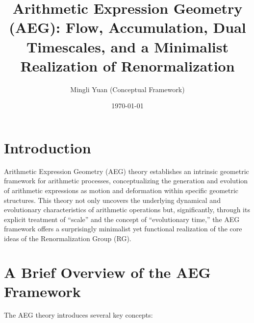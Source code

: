 \documentclass{article}
\title{Arithmetic Expression Geometry (AEG): Flow, Accumulation, Dual Timescales, and a Minimalist Realization of Renormalization}
\author{Mingli Yuan (Conceptual Framework)}
\date{\today}
\begin{document}
\maketitle

\section{Introduction}
Arithmetic Expression Geometry (AEG) theory \cite{YuanAEG} establishes an intrinsic geometric framework for arithmetic processes, conceptualizing the generation and evolution of arithmetic expressions as motion and deformation within specific geometric structures. This theory not only uncovers the underlying dynamical and evolutionary characteristics of arithmetic operations but, significantly, through its explicit treatment of ``scale'' and the concept of ``evolutionary time,'' the AEG framework offers a surprisingly minimalist yet functional realization of the core ideas of the Renormalization Group (RG).

\section{A Brief Overview of the AEG Framework}

The AEG theory introduces several key concepts:
\end{document}
